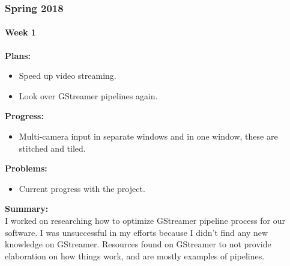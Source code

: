 \subsubsection{Spring 2018}

\paragraph{Week 1}
\begin{adjustwidth}{2.5em}{0pt}
    \vspace{-0.5cm}\textbf{Plans:}
    \vspace{-0.5cm}
    \begin{itemize}
        \item Speed up video streaming.
		\item Look over GStreamer pipelines again. 
    \end{itemize} 
    \vspace{-0.3cm}\textbf{Progress:}
    \vspace{-0.5cm}
    \begin{itemize}
        \item Multi-camera input in separate windows and in one window, these are stitched and tiled.  
    \end{itemize} 
    \vspace{-0.3cm}\textbf{Problems:}
    \vspace{-0.5cm}
    \begin{itemize}
        \item Current progress with the project.  
    \end{itemize}  
    \vspace{-0.3cm}\noindent\textbf{Summary:}\\
    \noindent I worked on researching how to optimize GStreamer pipeline process for our software. I was unsuccessful in my efforts because I didn't find any new knowledge on GStreamer. Resources found on GStreamer to not provide elaboration on how things work, and are mostly examples of pipelines. 
\end{adjustwidth}

